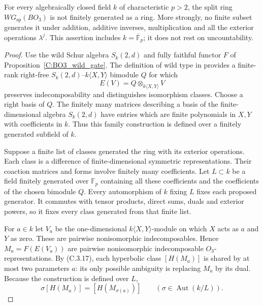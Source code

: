 \begin{proposition}
\label{C:BO3_not_finitely_generated}
For every algebraically closed field $k$ of characteristic $p>2$,
the split ring $WG_{\mathrm{sp}}(BO_3)$ is not finitely generated
as a ring. More strongly, no finite subset generates it under
addition, additive inverses, multiplication and all the exterior
operations $\lambda^j$. This assertion includes
$k=\overline{\mathbb F}_p$; it does not rest on uncountability.
\end{proposition}
\begin{proof}
Use the wild Schur algebra $S_k(2,d)$ and fully faithful functor
$F$ of Proposition~\ref{C:BO3_wild_gate}. The definition of wild
type in \cite[Section 2.1, printed p.142]{C-DotyErdmannMartinNakano1999}
provides a finite-rank right-free
$S_k(2,d)$--$k\langle X,Y\rangle$ bimodule $Q$ for which
\[
 E(V)=Q\otimes_{k\langle X,Y\rangle}V
\]
preserves indecomposability and distinguishes isomorphism classes.
Choose a right basis of $Q$. The finitely many matrices describing
a basis of the finite-dimensional algebra $S_k(2,d)$ have entries
which are finite polynomials in $X,Y$ with coefficients in $k$.
Thus this family construction is defined over a finitely generated
subfield of $k$.

Suppose a finite list of classes generated the ring with its
exterior operations. Each class is a difference of finite-dimensional
symmetric representations. Their coaction matrices and forms involve
finitely many coefficients. Let $L\subset k$ be a field finitely
generated over $\mathbb F_p$ containing all these coefficients
and the coefficients of the chosen bimodule $Q$.
Every automorphism of $k$ fixing $L$ fixes each proposed generator.
It commutes with tensor products, direct sums, duals and exterior
powers, so it fixes every class generated from that finite list.

For $a\in k$ let $V_a$ be the one-dimensional
$k\langle X,Y\rangle$-module on which $X$ acts as $a$ and $Y$
as zero. These are pairwise nonisomorphic indecomposables. Hence
$M_a=F(E(V_a))$ are pairwise nonisomorphic indecomposable
$O_3$-representations. By (C.3.17), each hyperbolic class
$[H(M_a)]$ is shared by at most two parameters $a$: its only
possible ambiguity is replacing $M_a$ by its dual.
Because the construction is defined over $L$,
\[
 \sigma[H(M_a)]=[H(M_{\sigma(a)})]
 \qquad (\sigma\in\operatorname{Aut}(k/L)).             \tag{C.3.18}
\]


\end{proof}
